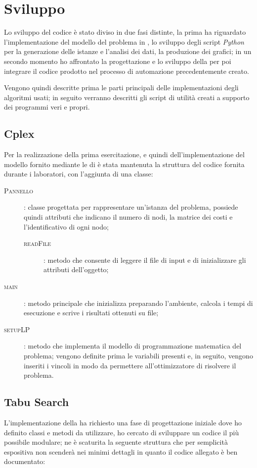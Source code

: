 \section{Sviluppo}
Lo sviluppo del codice è stato diviso in due fasi distinte, la prima ha riguardato l'implementazione del modello del problema in , lo sviluppo degli script \emph{Python} per la generazione delle istanze e l'analisi dei dati, la produzione dei grafici; in un secondo momento ho affrontato la progettazione e lo sviluppo della \tabu per poi integrare il codice prodotto nel processo di automazione precedentemente creato.

Vengono quindi descritte prima le parti principali delle implementazioni degli algoritmi usati; in seguito verranno descritti gli script di utilità creati a supporto dei programmi veri e propri.

\subsection{Cplex}
Per la realizzazione della prima esercitazione, e quindi dell'implementazione del modello fornito mediante le  di  è stata mantenuta la struttura del codice fornita durante i laboratori, con l'aggiunta di una classe: 

\begin{description}
	\item[\textsc{Pannello}]: classe progettata per rappresentare un'istanza del problema, possiede quindi attributi che indicano il numero di nodi, la matrice dei costi e l'identificativo di ogni nodo;
	\begin{description}
		\item[\textsc{readFile}]: metodo che consente di leggere il file di input e di inizializzare gli attributi dell'oggetto;
	\end{description}
	\item[\textsc{main}]: metodo principale che inizializza  preparando l'ambiente, calcola i tempi di esecuzione e scrive i risultati ottenuti su file;
	\item[\textsc{setupLP}]: metodo che implementa il modello di programmazione matematica del problema; vengono definite prima le variabili presenti e, in seguito, vengono inseriti i vincoli in modo da permettere all'ottimizzatore di risolvere il problema.
\end{description}

\subsection{Tabu Search}
L'implementazione della \tabu ha richiesto una fase di progettazione iniziale dove ho definito classi e metodi da utilizzare, ho cercato di sviluppare un codice il più possibile modulare; ne è scaturita la seguente struttura che per semplicità espositiva non scenderà nei minimi dettagli in quanto il codice allegato è ben documentato:

